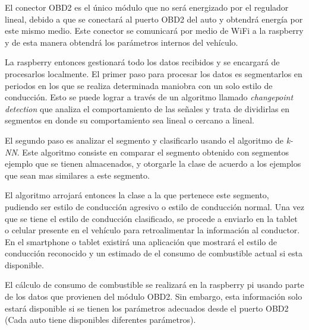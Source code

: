 El conector OBD2 es el único módulo que no será energizado por el regulador lineal, debido a que se conectará al puerto OBD2 del auto y obtendrá energía por este mismo medio. Este conector se comunicará por medio de WiFi a la raspberry y de esta manera obtendrá los parámetros internos del vehículo.

La raspberry entonces gestionará todo los datos recibidos y se encargará de procesarlos localmente. El primer paso para procesar los datos es segmentarlos en periodos en los que se realiza determinada maniobra con un solo estilo de conducción. Esto se puede lograr a través de un algoritmo llamado {\it changepoint detection} que analiza el comportamiento de las señales y trata de dividirlas en segmentos en donde su comportamiento sea lineal o cercano a lineal.

El segundo paso es analizar el segmento y clasificarlo usando el algoritmo de {\it k-NN}. Este algoritmo consiste en comparar el segmento obtenido con segmentos ejemplo que se tienen almacenados, y otorgarle la clase de acuerdo a los ejemplos que sean mas similares a este segmento.

El algoritmo arrojará entonces la clase a la que pertenece este segmento, pudiendo ser estilo de conducción agresivo o estilo de conducción normal. Una vez que se tiene el estilo de conducción clasificado, se procede a enviarlo en la tablet o celular presente en el vehículo para retroalimentar la información al conductor. En el smartphone o tablet existirá una aplicación que mostrará el estilo de conducción reconocido y un estimado de el consumo de combustible actual si esta disponible.

El cálculo de consumo de combustible se realizará en la raspberry pi usando parte de los datos que provienen del módulo OBD2. Sin embargo,  esta información solo estará disponible si se tienen los parámetros adecuados desde el puerto OBD2 (Cada auto tiene disponibles diferentes parámetros).

